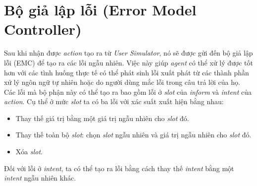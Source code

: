 \section{Bộ giả lập lỗi (Error Model Controller)}
Sau khi nhận được \textit{action} tạo ra từ \textit{User Simulator}, nó sẽ được gửi đến bộ giả lập lỗi (EMC) để tạo ra các lỗi ngẫu nhiên. Việc này giúp \textit{agent} có thể xử lý được tốt hơn với các tình huống thực tế có thể phát sinh lỗi xuất phát từ các thành phần xử lý ngôn ngữ tự nhiên hoặc do người dùng mắc lỗi trong câu trả lời của họ. Các lỗi mà bộ phận này có thể tạo ra bao gồm lỗi ở \textit{slot} của \textit{inform} và \textit{intent} của \textit{action}. Cụ thể ở mức \textit{slot} ta có ba lỗi với xác suất xuất hiện bằng nhau:

\begin{itemize}
    \item Thay thế giá trị bằng một giá trị ngẫu nhiên cho \textit{slot} đó.
    \item Thay thế toàn bộ \textit{slot}: chọn \textit{slot} ngẫu nhiên và giá trị ngẫu nhiên cho \textit{slot} đó.
    \item Xóa \textit{slot}.
\end{itemize}

Đối với lỗi ở \textit{intent}, ta có thể tạo ra lỗi bằng cách thay thế \textit{intent} bằng một \textit{intent} ngẫu nhiên khác.
